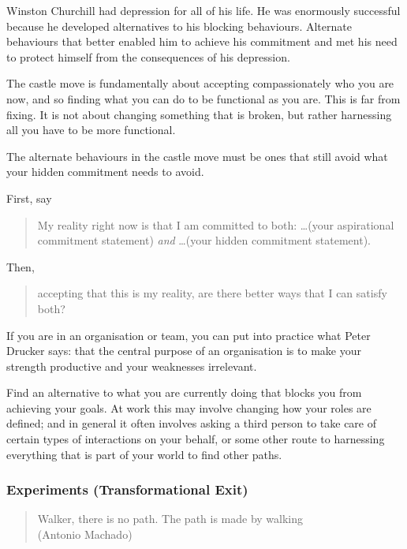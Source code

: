 Winston Churchill had depression for all of his life. He was enormously successful because he developed alternatives to his blocking behaviours. Alternate behaviours that better enabled him to achieve his commitment and met his need to protect himself from the consequences of his depression. 


The castle move is fundamentally about accepting compassionately who you are now, and so finding what you can do to be functional as you are. This is far from fixing. It is not about changing something that is broken, but rather harnessing all you have to be more functional.


The alternate behaviours in the castle move must be ones that still avoid what your hidden commitment needs to avoid.


First, say 


\begin{quote}
My reality right now is that I am committed to both: \ldots (your aspirational commitment statement) \emph{and} \ldots (your hidden commitment statement). 
\end{quote}


Then, 


\begin{quote}
accepting that this is my reality, are there better ways that I can satisfy both? 
\end{quote}


If you are in an organisation or team, you can put into practice what Peter Drucker says: that the central purpose of an organisation is to make your strength productive and your weaknesses irrelevant. 


Find an alternative to what you are currently doing that blocks you from achieving your goals. At work this may involve changing how your roles are defined; and in general it often involves asking a third person to take care of certain types of interactions on your behalf, or some other route to harnessing everything that is part of your world to find other paths.


\subsubsection{Experiments (Transformational Exit)}


\begin{quote}
Walker, there is no path. The path is made by walking\\
\raggedleft\textemdash (Antonio Machado)
\end{quote}


